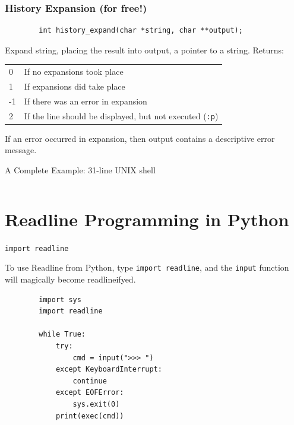 \documentclass[aspectratio=1610]{beamer}
\begin{document}
\begin{frame}[fragile]
    \frametitle{History Expansion (for free!)}
    \begin{verbatim}
        int history_expand(char *string, char **output);
    \end{verbatim}

    Expand string, placing the result into output, a pointer to a string.  Returns:
    \begin{tabular}{l l}
        0 &    If no expansions took place \\
        1 &    If expansions did take place \\
        -1 &   If there was an error in expansion \\
        2 &    If the line should be displayed, but not executed (\texttt{:p}) \\
    \end{tabular}

    If an error occurred in expansion, then output contains a descriptive error
    message.
\end{frame}

\begin{frame}[fragile]{A Complete Example: 31-line UNIX shell}
    \tiny
    \inputminted[linenos]{c}{codesnip/progexample.c}
\end{frame}

\section{Readline Programming in Python}

\begin{frame}[fragile]{\texttt{import readline}}

    To use Readline from Python, type \texttt{import readline}, and the
    \texttt{input} function will magically become readlineifyed.

    \begin{verbatim}
        import sys
        import readline

        while True:
            try:
                cmd = input(">>> ")
            except KeyboardInterrupt:
                continue
            except EOFError:
                sys.exit(0)
            print(exec(cmd))
    \end{verbatim}
\end{frame}
\end{document}
